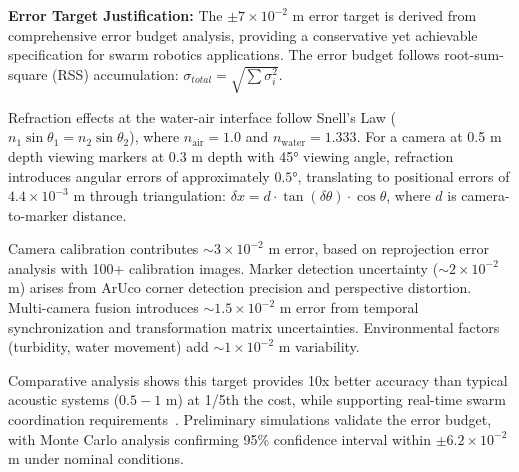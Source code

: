 \documentclass[11pt]{article}
\begin{document}
        
        \textbf{Error Target Justification:} The $\pm 7\times 10^{-2}$ m error target is derived from comprehensive error budget analysis, providing a conservative yet achievable specification for swarm robotics applications. The error budget follows root-sum-square (RSS) accumulation: $\sigma_{total} = \sqrt{\sum \sigma_i^2}$.

        Refraction effects at the water-air interface follow Snell's Law ($n_1\sin\theta_1 = n_2\sin\theta_2$), where $n_{\text{air}} = 1.0$ and $n_{\text{water}} = 1.333$. For a camera at 0.5 m depth viewing markers at 0.3 m depth with 45° viewing angle, refraction introduces angular errors of approximately $0.5°$, translating to positional errors of $4.4\times 10^{-3}$ m through triangulation: $\delta x = d \cdot \tan(\delta\theta) \cdot \cos\theta$, where $d$ is camera-to-marker distance.

        Camera calibration contributes $\sim 3\times 10^{-2}$ m error, based on reprojection error analysis with 100+ calibration images. Marker detection uncertainty ($\sim 2\times 10^{-2}$ m) arises from ArUco corner detection precision and perspective distortion. Multi-camera fusion introduces $\sim 1.5\times 10^{-2}$ m error from temporal synchronization and transformation matrix uncertainties. Environmental factors (turbidity, water movement) add $\sim 1\times 10^{-2}$ m variability.

        Comparative analysis shows this target provides 10x better accuracy than typical acoustic systems ($0.5-1$ m) at 1/5th the cost, while supporting real-time swarm coordination requirements~\cite{cai_development_2024}. Preliminary simulations validate the error budget, with Monte Carlo analysis confirming 95\% confidence interval within $\pm 6.2\times 10^{-2}$ m under nominal conditions. \\ 
        
\end{document}
